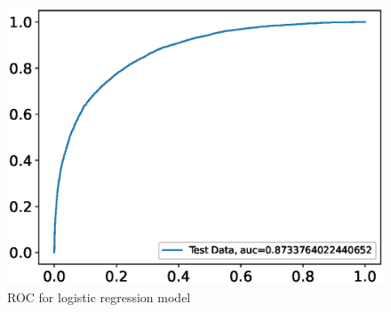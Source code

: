 \documentclass[11pt, a4paper, jou]{apa7}
\begin{document}
\begin{figure}[p]
    \centering
    \caption{ROC for logistic regression model}\label{fig:logistic_roc}
    \includegraphics[width=.45\textwidth]{figures/Roc.eps}
\end{figure}
\end{document}
